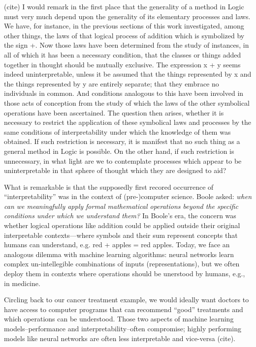 \begin{displaycquote}[pp.~48]{(cite)}
I would remark in the first place that the generality of a method in Logic
must very much depend upon the generality of its elementary processes and laws.
We have, for instance, in the previous sections of this work investigated, among
other things, the laws of that logical process of addition which is symbolized by
the sign +. Now those laws have been determined from the study of instances,
in all of which it has been a necessary condition, that the classes or things added
together in thought should be mutually exclusive. The expression x + y seems
indeed uninterpretable, unless it be assumed that the things represented by x
and the things represented by y are entirely separate; that they embrace no
individuals in common. And conditions analogous to this have been involved
in those acts of conception from the study of which the laws of the other
symbolical operations have been ascertained. The question then arises, whether
it is necessary to restrict the application of these symbolical laws and processes
by the same conditions of interpretability under which the knowledge of them
was obtained. If such restriction is necessary, it is manifest that no such thing
as a general method in Logic is possible. On the other hand, if such restriction
is unnecessary, in what light are we to contemplate processes which appear to
be uninterpretable in that sphere of thought which they are designed to aid?
\end{displaycquote}
What is remarkable is that the supposedly first recored occurrence of ``interpretability'' was in the context of (pre-)computer science. Boole asked: \textit{when can we meaningfully apply formal mathematical operations beyond the specific conditions under which we understand them?}
In Boole's era, the concern was whether logical operations like addition could be applied outside their original interpretable contexts—where symbols and their sum represent concepts that humans can understand, e.g. red + apples = red apples. Today, we face an analogous dilemma with machine learning algorithms: neural networks learn complex un-intellegible combinations of inputs (representations), but we often deploy them in contexts where operations should be unerstood by humans, e.g., in medicine. 

Circling back to our cancer treatment example, we would ideally want doctors to have access to computer programs that can recommend ``good'' treatments and which operations can be understood. Those two aspects of machine learning models--performance and interpretability--often compromise; highly performing models like neural networks are often less interpretable and vice-versa (cite).

